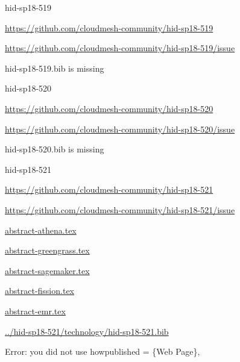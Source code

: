 \begin{IU}

hid-sp18-519

\url{https://github.com/cloudmesh-community/hid-sp18-519}

\url{https://github.com/cloudmesh-community/hid-sp18-519/issue}

hid-sp18-519.bib is missing

\end{IU}


\begin{IU}

hid-sp18-520

\url{https://github.com/cloudmesh-community/hid-sp18-520}

\url{https://github.com/cloudmesh-community/hid-sp18-520/issue}

hid-sp18-520.bib is missing

\end{IU}


\begin{IU}

hid-sp18-521

\url{https://github.com/cloudmesh-community/hid-sp18-521}

\url{https://github.com/cloudmesh-community/hid-sp18-521/issue}

\href{https://github.com/cloudmesh-community/hid-sp18-521/blob/master//technology/abstract-athena.tex}{abstract-athena.tex}

\href{https://github.com/cloudmesh-community/hid-sp18-521/blob/master//technology/abstract-greengrass.tex}{abstract-greengrass.tex}

\href{https://github.com/cloudmesh-community/hid-sp18-521/blob/master//technology/abstract-sagemaker.tex}{abstract-sagemaker.tex}

\href{https://github.com/cloudmesh-community/hid-sp18-521/blob/master//technology/abstract-fission.tex}{abstract-fission.tex}

\href{https://github.com/cloudmesh-community/hid-sp18-521/blob/master//technology/abstract-emr.tex}{abstract-emr.tex}

\href{https://github.com/cloudmesh-community/hid-sp18-521/blob/master//technology/hid-sp18-521.bib}{../hid-sp18-521/technology/hid-sp18-521.bib}

Error: you did not use howpublished = \{Web Page\},

\end{IU}


